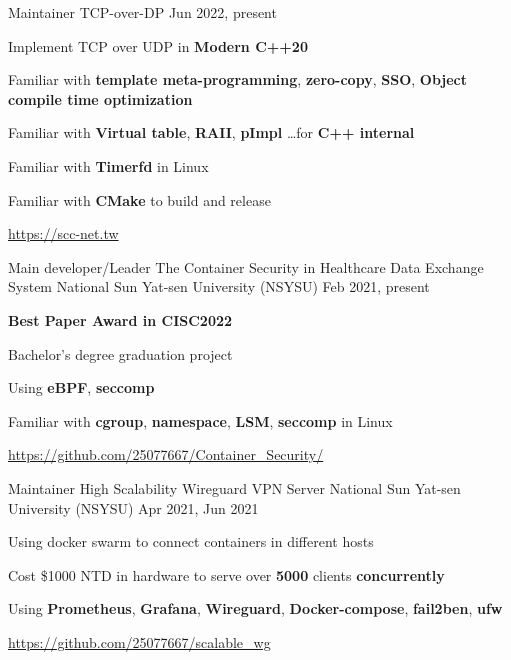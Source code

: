 \begin{cventries}
    \cventry
    {Maintainer}
    {TCP-over-DP}
    {} %
    {Jun 2022, present} %
    {
        \begin{cvitems} %
            \item {Implement TCP over UDP in \textbf{Modern C++20}}
            \item {Familiar with \textbf{template meta-programming}, \textbf{zero-copy}, \textbf{SSO}, \textbf{Object compile time optimization}}
            \item {Familiar with \textbf{Virtual table}, \textbf{RAII}, \textbf{pImpl} \dots for \textbf{C++ internal}}
            \item Familiar with \textbf{Timerfd} in Linux
            \item Familiar with \textbf{CMake} to build and release
            \item {\url{https://scc-net.tw}}
        \end{cvitems}
    }

    \cventry
    {Main developer/Leader}
    {The Container Security in Healthcare Data Exchange System}
    {National Sun Yat-sen University (NSYSU)} %
    {Feb 2021, present} %
    {
        \begin{cvitems} %
            \item {\textbf{Best Paper Award in CISC2022}}
            \item {Bachelor's degree graduation project}
            \item {Using \textbf{eBPF}, \textbf{seccomp}}
            \item {Familiar with \textbf{cgroup}, \textbf{namespace}, \textbf{LSM}, \textbf{seccomp} in Linux}
            \item {\url{https://github.com/25077667/Container_Security/}}
        \end{cvitems}
    }

    \cventry
    {Maintainer}
    {High Scalability Wireguard VPN Server}
    {National Sun Yat-sen University (NSYSU)} %
    {Apr 2021, Jun 2021} %
    {
        \begin{cvitems} %
            \item {Using docker swarm to connect containers in different hosts}
            \item {Cost \$1000 NTD in hardware to serve over \textbf{5000} clients \textbf{concurrently}}
            \item {Using \textbf{Prometheus}, \textbf{Grafana}, \textbf{Wireguard}, \textbf{Docker-compose}, \textbf{fail2ben}, \textbf{ufw}}
            \item {\url{https://github.com/25077667/scalable_wg}}
        \end{cvitems}
    }


\end{cventries}
